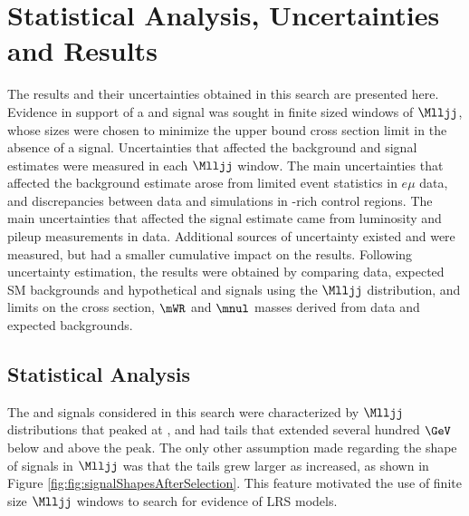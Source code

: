 \chapter{Statistical Analysis, Uncertainties and Results}
\label{statAnalysis_uncerts_results}
The results and their uncertainties obtained in this search are presented here.  Evidence in 
support of a \WR and \nul signal was sought in finite sized windows of $\Mlljj$, whose sizes 
were chosen to minimize the upper bound \WR cross section limit in the absence of a signal.  
Uncertainties that affected the background and signal estimates were measured in each $\Mlljj$ 
window.  The main uncertainties that affected the background estimate arose from limited event 
statistics in $e\mu$ data, and discrepancies between data and simulations in \DY-rich control 
regions.  The main uncertainties that affected the signal estimate came from luminosity and 
pileup measurements in data.  Additional sources of uncertainty existed and were measured, 
but had a smaller cumulative impact on the results.  Following uncertainty estimation, the 
results were obtained by comparing data, expected SM backgrounds and hypothetical 
\WR and \nul signals using the $\Mlljj$ distribution, and limits on the \WR cross section, 
$\mWR$ and $\mnul$ masses derived from data and expected backgrounds.

\section{Statistical Analysis}
\label{sec:massWindows}
The \WR and \nul signals considered in this search were characterized by $\Mlljj$ distributions 
that peaked at \mWR, and had tails that extended several hundred $\GeV$ below and above the 
peak.  The only other assumption made regarding the shape of signals in $\Mlljj$ was that 
the tails grew larger as \mWR increased, as shown in Figure \ref{fig:fig:signalShapesAfterSelection}.  
This feature motivated the use of finite size $\Mlljj$ windows to search for evidence of LRS 
models.

